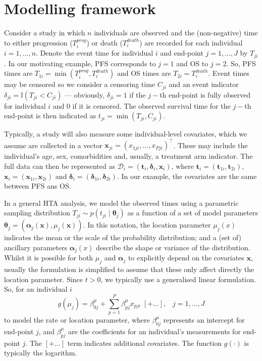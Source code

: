 \documentclass[AMA,STIX1COL]{WileyNJD-v2}
\begin{document}
\section{Modelling framework}\label{sec:methods}
Consider a study in which $n$ individuals are observed and the (non-negative) time to either progression ($T^{prog}_{i}$) or death ($T^{death}_{i}$) are recorded for each individual $i=1,\ldots,n$.
Denote the event time for individual $i$ and end-point $j = 1, \ldots, J$ by $T_{ji}$.
In our motivating example, PFS corresponds to $j=1$ and OS to $j=2$.
So, PFS times are $T_{1i} = \min(T^{prog}_{i}, T^{death}_{i})$ and OS times are $T_{2i} = T^{death}_{i}$.
Event times may be censored so we consider a censoring time $C_{ji}$ and an event indicator $\delta_{ji} = \mathbb{I}(T_{ji} < C_{ji})$
--- obviously, $\delta_{ji} = 1$ if the $j-$th end-point is fully observed for individual $i$ and 0 if it is censored.
The observed survival time for the $j-$th end-point is then indicated as $t_{ji} = \min(T_{ji}, C_{ji})$.

Typically, a study will also measure some individual-level covariates, which we assume are collected in a vector $\bm{x}_{ji} = (x_{1ji}, \ldots, x_{Pji})^\top$.
These may include the individual's age, sex, comorbidities and, usually, a treatment arm indicator.
The full data can then be represented as
$\mathcal{D}_i = (\bm{t}_i, \bm{\delta}_i, \bm{x}_i)$,
where $\bm{t}_i = (\bm{t}_{1i}, \bm{t}_{2i})$, $\bm{x}_i = (\bm{x}_{1i}, \bm{x}_{2i})$ and $\bm{\delta}_i = (\bm{\delta}_{1i}, \bm\delta_{2i})$.
In our example, the covariates are the same between PFS ans OS.

In a general HTA analysis, we model the observed times using a parametric sampling distribution $T_{ji} \sim p(t_{ji} \mid \bm\theta_j)$ as a function of a set of model parameters $\bm\theta_j = (\bm\alpha_j(\bm x), \mu_j(\bm x))$. 
In this notation, the location parameter $\mu_j(x)$ indicates the mean or the scale of the probability distribution; and a (set of) ancillary parameters $\bm \alpha_j(x)$ describe the shape or variance of the distribution.
Whilst it is possible for both $\mu_j$ and $\bm\alpha_j$ to explicitly depend on the covariates $\bm x$, usually the formulation is simplified to assume that these only affect directly the location parameter.
Since $t > 0$, we typically use a generalised linear formulation.
So, for an individual $i$
$$
g(\mu_{j}) = \beta^{\mu}_{0j} + \sum_{p=1}^P \beta^{\mu}_{pj} x_{pji} \; [+ \ldots ], \;\;\; j = 1, \ldots, J
$$
to model the rate or location parameter,
where $\beta^{\mu}_{0j}$ represents an intercept for end-point $j$,
and $\beta^{\mu}_{pj}$ are the coefficients for an individual's measurements for end-point $j$.
The $[+ \ldots]$ term indicates additional covariates.
The function $g(\cdot)$ is typically the logarithm.
\end{document}

